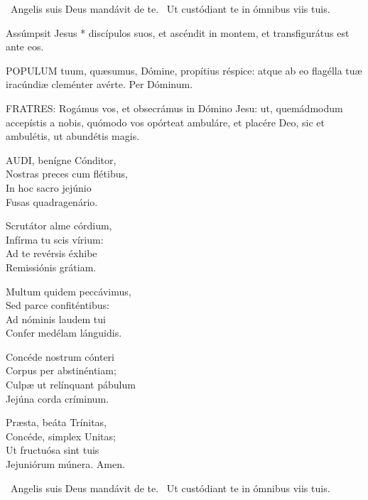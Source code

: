 \V\ Angelis suis Deus mandávit de te. \R\ Ut custódiant te in ómnibus viis tuis.

 Assúmpsit Jesus * discípulos suos, et ascéndit in montem, et transfigurátus est ante eos.


\lettrine[lines=2]{P}{OPULUM} tuum, quæsumus, Dómine, propítius réspice: atque ab eo flagélla tuæ iracúndiæ cleménter avérte. Per Dóminum.




\lettrine[lines=2]{F}{RATRES}: Rogámus vos, et obsecrámus in Dómino Jesu: ut, quemádmodum accepístis a nobis, quómodo vos opórteat ambuláre, et placére Deo, sic et ambulétis, ut abundétis magis.


\lettrine[lines=2]{A}{UDI}, benígne Cónditor,\\
Nostras preces cum flétibus,\\
In hoc sacro jejúnio\\
Fusas quadragenário.

Scrutátor alme córdium,\\
Infírma tu scis vírium:\\
Ad te revérsis éxhibe\\
Remissiónis grátiam.

Multum quidem peccávimus,\\
Sed parce confiténtibus:\\
Ad nóminis laudem tui\\
Confer medélam lánguidis.

Concéde nostrum cónteri\\
Corpus per abstinéntiam;\\
Culpæ ut relínquant pábulum\\
Jejúna corda críminum.


Præsta, beáta Trínitas,\\
Concéde, simplex Unitas;\\
Ut fructuósa sint tuis\\
Jejuniórum múnera. Amen.

\V\ Angelis suis Deus mandávit de te. \R\ Ut custódiant te in ómnibus viis tuis.

